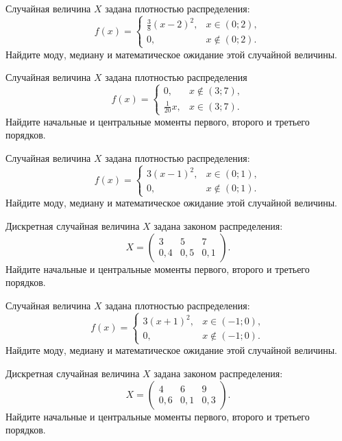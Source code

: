 \vfill

\newpage\setcounter{zad}{0}

\z Случайная величина $X$ задана плотностью распределения: $$f(x) = \begin{cases} \frac{3}{8}(x-2)^2, & x \in (0; 2), \\ 0, & x \not\in (0; 2). \end{cases}$$ Найдите моду, медиану и математическое ожидание этой случайной величины.


\vfill

\z Случайная величина $X$ задана плотностью распределения $$f(x) = \begin{cases}0, & x\not\in(3; 7), \\ \frac{1}{20}x, & x\in(3; 7).\end{cases}$$ Найдите начальные и центральные моменты первого, второго и третьего порядков.
 

\vfill

\newpage\setcounter{zad}{0}

\z Случайная величина $X$ задана плотностью распределения: $$f(x) = \begin{cases} 3(x-1)^2, & x \in (0; 1), \\ 0, & x \not\in (0; 1). \end{cases}$$ Найдите моду, медиану и математическое ожидание этой случайной величины.


\vfill

\z Дискретная случайная величина $X$ задана законом распределения: $$ X = \left(\begin{array}{rrr}3 & 5 & 7\\0{,}4 & 0{,}5 & 0{,}1\end{array}\right).$$ Найдите начальные и центральные моменты первого, второго и третьего порядков.
 

\vfill

\newpage\setcounter{zad}{0}

\z Случайная величина $X$ задана плотностью распределения: $$f(x) = \begin{cases} 3(x+1)^2, & x \in (-1; 0), \\ 0, & x \not\in (-1; 0). \end{cases}$$ Найдите моду, медиану и математическое ожидание этой случайной величины.


\vfill

\z Дискретная случайная величина $X$ задана законом распределения: $$ X = \left(\begin{array}{rrr}4 & 6 & 9\\0{,}6 & 0{,}1 & 0{,}3\end{array}\right).$$ Найдите начальные и центральные моменты первого, второго и третьего порядков.
 


